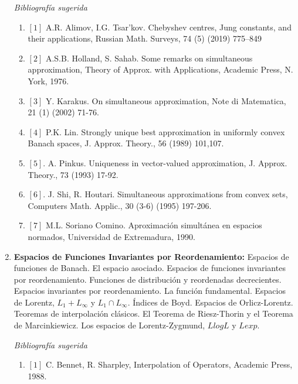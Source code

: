 \documentclass[10pt,a4paper]{article}
\begin{document}
\begin{enumerate}
\noindent \textit{Bibliografía sugerida}

\begin{enumerate}[]

\item $[1]$  A.R. Alimov, I.G. Tsar’kov. Chebyshev centres, Jung constants, and their applications, Russian Math. Surveys, 74 (5) (2019) 775–849

\item $[2]$	 A.S.B. Holland, S. Sahab. Some remarks on simultaneous approximation, Theory of Approx. with Applications, Academic Press, N. York, 1976.

\item $[3]$ 	Y. Karakus. On simultaneous approximation, Note di Matematica, 21 (1) (2002) 71-76.

\item $[4]$ P.K. Lin. Strongly unique best approximation in uniformly convex Banach spaces, J. Approx. Theory., 56 (1989) 101,107.

\item $[5]$.	A. Pinkus. Uniqueness in vector-valued approximation, J. Approx. Theory., 73 (1993) 17-92.

\item $[6]$.	J. Shi, R. Houtari. Simultaneous approximations from convex sets, Computers Math. Applic., 30 (3-6) (1995) 197-206.

\item $[7]$ M.L. Soriano Comino. Aproximación simultánea en espacios normados, Universidad de Extremadura, 1990.
\end{enumerate}

\item\textbf{Espacios de Funciones Invariantes por Reordenamiento:} Espacios de funciones de Banach. El espacio asociado. Espacios de funciones invariantes por reordenamiento. Funciones de distribución y reordenadas decrecientes. Espacios invariantes por reordenamiento. La función fundamental.  Espacios de Lorentz, $L_1+ L_\infty$ y $L_1 \cap L_\infty$. Índices de Boyd. Espacios de Orlicz-Lorentz. Teoremas de interpolación clásicos. El Teorema de Riesz-Thorin y el Teorema de Marcinkiewicz. Los espacios de Lorentz-Zygmund, $LlogL$ y $Lexp$.

\noindent \textit{Bibliografía sugerida}

\begin{enumerate}[]

\item $[1]$ C. Bennet, R. Sharpley, Interpolation of Operators, Academic Press, 1988.


\end{enumerate}
\end{enumerate}
\end{document}

